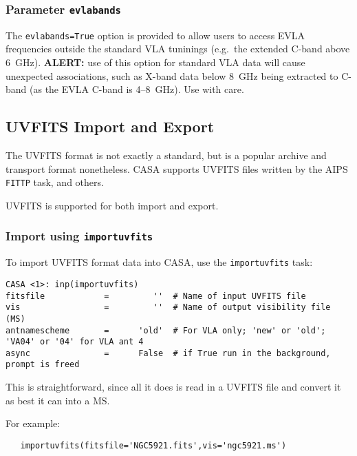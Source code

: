 \subsubsection{Parameter {\tt evlabands} }
\label{section:io.import.vla.evlabands}

The {\tt evlabands=True} option is provided to allow users to access
EVLA frequencies outside the standard VLA tuninings (e.g.\ the extended
C-band above 6~GHz).  {\bf ALERT:} use of this option for standard VLA
data will cause unexpected associations, such as X-band data below
8~GHz being extracted to C-band (as the EVLA C-band is 4--8~GHz).  Use
with care.

\subsection{UVFITS Import and Export}
\label{section:io.import.uvfits}

The UVFITS format is not exactly a standard, but is a popular
archive and transport format nonetheless.  CASA supports 
UVFITS files written by the AIPS {\tt FITTP} task, and others.

UVFITS is supported for both import and export.

\subsubsection{Import using {\tt importuvfits} }
\label{section:io.import.uvfits.import}

To import UVFITS format data into CASA, use the {\tt importuvfits} task: 
\small
\begin{verbatim}
CASA <1>: inp(importuvfits)
fitsfile            =         ''  # Name of input UVFITS file
vis                 =         ''  # Name of output visibility file (MS)
antnamescheme       =      'old'  # For VLA only; 'new' or 'old'; 'VA04' or '04' for VLA ant 4
async               =      False  # if True run in the background, prompt is freed
\end{verbatim}
\normalsize
This is straightforward, since all it does is read in a UVFITS file and
convert it as best it can into a MS.

For example:
\small
\begin{verbatim}
   importuvfits(fitsfile='NGC5921.fits',vis='ngc5921.ms')
\end{verbatim}
\normalsize

